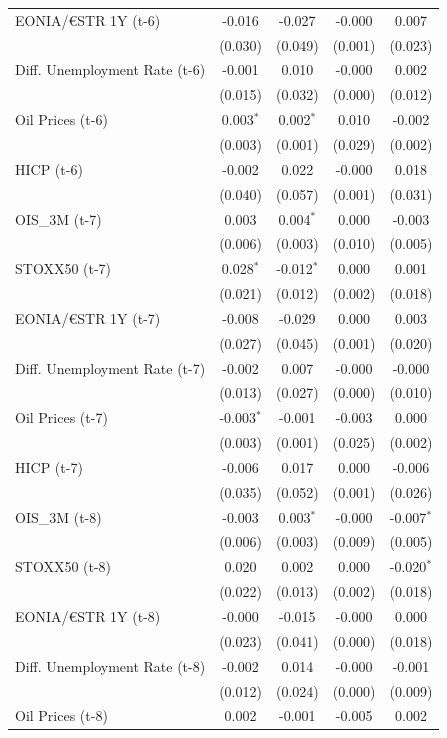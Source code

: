 \begin{longtable}[t]{lcccc}
EONIA/€STR 1Y (t-6) & -0.016 & -0.027 & -0.000 & 0.007\\
 & (0.030) & (0.049) & (0.001) & (0.023)\\
Diff. Unemployment Rate (t-6) & -0.001 & 0.010 & -0.000 & 0.002\\
 & (0.015) & (0.032) & (0.000) & (0.012)\\
Oil Prices (t-6) & 0.003$^{*}$ & 0.002$^{*}$ & 0.010 & -0.002\\
 & (0.003) & (0.001) & (0.029) & (0.002)\\
HICP (t-6) & -0.002 & 0.022 & -0.000 & 0.018\\
 & (0.040) & (0.057) & (0.001) & (0.031)\\
OIS\_3M (t-7) & 0.003 & 0.004$^{*}$ & 0.000 & -0.003\\
 & (0.006) & (0.003) & (0.010) & (0.005)\\
STOXX50 (t-7) & 0.028$^{*}$ & -0.012$^{*}$ & 0.000 & 0.001\\
 & (0.021) & (0.012) & (0.002) & (0.018)\\
EONIA/€STR 1Y (t-7) & -0.008 & -0.029 & 0.000 & 0.003\\
 & (0.027) & (0.045) & (0.001) & (0.020)\\
Diff. Unemployment Rate (t-7) & -0.002 & 0.007 & -0.000 & -0.000\\
 & (0.013) & (0.027) & (0.000) & (0.010)\\
Oil Prices (t-7) & -0.003$^{*}$ & -0.001 & -0.003 & 0.000\\
 & (0.003) & (0.001) & (0.025) & (0.002)\\
HICP (t-7) & -0.006 & 0.017 & 0.000 & -0.006\\
 & (0.035) & (0.052) & (0.001) & (0.026)\\
OIS\_3M (t-8) & -0.003 & 0.003$^{*}$ & -0.000 & -0.007$^{*}$\\
 & (0.006) & (0.003) & (0.009) & (0.005)\\
STOXX50 (t-8) & 0.020 & 0.002 & 0.000 & -0.020$^{*}$\\
 & (0.022) & (0.013) & (0.002) & (0.018)\\
EONIA/€STR 1Y (t-8) & -0.000 & -0.015 & -0.000 & 0.000\\
 & (0.023) & (0.041) & (0.000) & (0.018)\\
Diff. Unemployment Rate (t-8) & -0.002 & 0.014 & -0.000 & -0.001\\
 & (0.012) & (0.024) & (0.000) & (0.009)\\
Oil Prices (t-8) & 0.002 & -0.001 & -0.005 & 0.002\\

\end{longtable}
